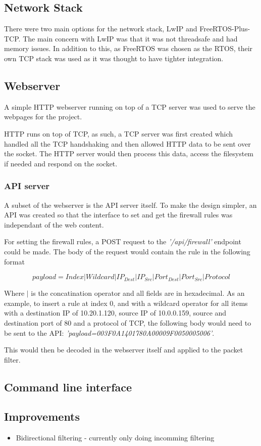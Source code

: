 \subsection{Network Stack}
There were two main options for the network stack, LwIP and FreeRTOS-Plus-TCP. The main concern with LwIP was that it was not threadsafe and had memory issues. In addition to this, as FreeRTOS was chosen as the RTOS, their own TCP stack was used as it was thought to have tighter integration. 


\subsection{Webserver}
A simple HTTP webserver running on top of a TCP server was used to serve the webpages for the project. 

HTTP runs on top of TCP, as such, a TCP server was first created which handled all the TCP handshaking and then allowed HTTP data to be sent over the socket. The HTTP server would then process this data, access the filesystem if needed and respond on the socket. 


\subsubsection{API server}
A subset of the webserver is the API server itself. To make the design simpler, an API was created so that the interface to set and get the firewall rules was independant of the web content.

For setting the firewall rules, a POST request to the \textit{'/api/firewall'} endpoint could be made. The body of the request would contain the rule in the following format

\[
payload=Index | Wildcard | IP_{Dest} |  IP_{Src}  | Port_{Dest} |  Port_{Src} | Protocol
\]

Where $|$ is the concatination operator and all fields are in hexadecimal. As an example, to insert a rule at index 0, and with a wildcard operator for all items with a destination IP of 10.20.1.120, source IP of 10.0.0.159, source and destination port of 80 and a protocol of TCP, the following body would need to be sent to the API: \textit{'payload=003F0A1401780A00009F0050005006'}.

This would then be decoded in the webserver itself and applied to the packet filter. 




\subsection{Command line interface}


\subsection{Improvements}

\begin{itemize}
    \item Bidirectional filtering - currently only doing incomming filtering
\end{itemize}